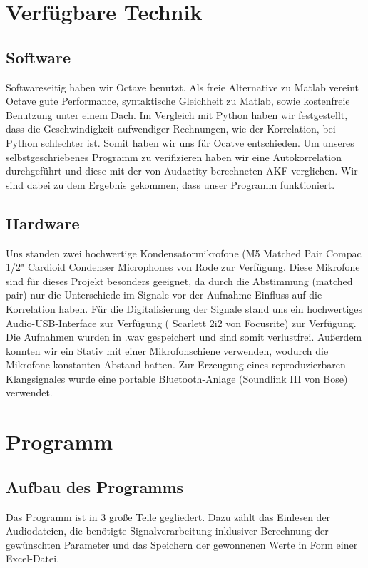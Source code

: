 \section{Verfügbare Technik}
\subsection{Software}
Softwareseitig haben wir Octave benutzt. Als freie Alternative zu Matlab vereint Octave gute Performance, syntaktische Gleichheit zu Matlab, sowie kostenfreie Benutzung unter einem Dach. Im Vergleich mit Python haben wir festgestellt, dass die Geschwindigkeit aufwendiger Rechnungen, wie der Korrelation, bei Python schlechter ist. Somit haben wir uns für Ocatve entschieden. Um unseres selbstgeschriebenes Programm zu verifizieren haben wir eine Autokorrelation durchgeführt und diese mit der von Audactity berechneten AKF verglichen. Wir sind dabei zu dem Ergebnis gekommen, dass unser Programm funktioniert.
\subsection{Hardware}
Uns standen zwei hochwertige Kondensatormikrofone (M5 Matched Pair Compac 1/2" Cardioid Condenser Microphones von Rode zur Verfügung. Diese Mikrofone sind für dieses Projekt besonders geeignet, da durch die Abstimmung (matched pair) nur die Unterschiede im Signale vor der Aufnahme Einfluss auf die Korrelation haben. Für die Digitalisierung der Signale stand uns ein hochwertiges Audio-USB-Interface zur Verfügung ( Scarlett 2i2 von Focusrite) zur Verfügung. Die Aufnahmen wurden in .wav gespeichert und sind somit verlustfrei. Außerdem konnten wir ein Stativ mit einer Mikrofonschiene verwenden, wodurch die Mikrofone konstanten Abstand hatten. Zur Erzeugung eines reproduzierbaren Klangsignales wurde eine portable Bluetooth-Anlage (Soundlink III von Bose) verwendet.
\section{Programm}
\subsection{Aufbau des Programms}
Das Programm ist in 3 große Teile gegliedert. Dazu zählt das Einlesen der Audiodateien, die benötigte Signalverarbeitung inklusiver Berechnung der gewünschten Parameter und das Speichern der gewonnenen Werte in Form einer Excel-Datei.
